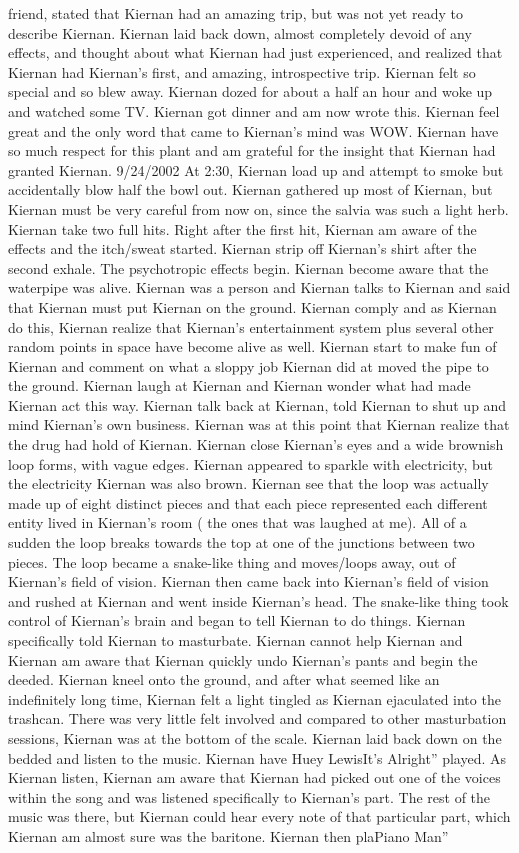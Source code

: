 \documentclass[12pt]{book}
\begin{document}
friend, stated that Kiernan had an amazing trip, but was not yet ready to describe Kiernan. Kiernan laid back down, almost completely devoid of any effects, and thought about what Kiernan had just experienced, and realized that Kiernan had Kiernan's first, and amazing, introspective trip. Kiernan felt so special and so blew away. Kiernan dozed for about a half an hour and woke up and watched some TV. Kiernan got dinner and am now wrote this. Kiernan feel great and the only word that came to Kiernan's mind was WOW. Kiernan have so much respect for this plant and am grateful for the insight that Kiernan had granted Kiernan. 9/24/2002 At 2:30, Kiernan load up and attempt to smoke but accidentally blow half the bowl out. Kiernan gathered up most of Kiernan, but Kiernan must be very careful from now on, since the salvia was such a light herb. Kiernan take two full hits. Right after the first hit, Kiernan am aware of the effects and the itch/sweat started. Kiernan strip off Kiernan's shirt after the second exhale. The psychotropic effects begin. Kiernan become aware that the waterpipe was alive. Kiernan was a person and Kiernan talks to Kiernan and said that Kiernan must put Kiernan on the ground. Kiernan comply and as Kiernan do this, Kiernan realize that Kiernan's entertainment system plus several other random points in space have become alive as well. Kiernan start to make fun of Kiernan and comment on what a sloppy job Kiernan did at moved the pipe to the ground. Kiernan laugh at Kiernan and Kiernan wonder what had made Kiernan act this way. Kiernan talk back at Kiernan, told Kiernan to shut up and mind Kiernan's own business. Kiernan was at this point that Kiernan realize that the drug had hold of Kiernan. Kiernan close Kiernan's eyes and a wide brownish loop forms, with vague edges. Kiernan appeared to sparkle with electricity, but the electricity Kiernan was also brown. Kiernan see that the loop was actually made up of eight distinct pieces and that each piece represented each different entity lived in Kiernan's room ( the ones that was laughed at me). All of a sudden the loop breaks towards the top at one of the junctions between two pieces. The loop became a snake-like thing and moves/loops away, out of Kiernan's field of vision. Kiernan then came back into Kiernan's field of vision and rushed at Kiernan and went inside Kiernan's head. The snake-like thing took control of Kiernan's brain and began to tell Kiernan to do things. Kiernan specifically told Kiernan to masturbate. Kiernan cannot help Kiernan and Kiernan am aware that Kiernan quickly undo Kiernan's pants and begin the deeded. Kiernan kneel onto the ground, and after what seemed like an indefinitely long time, Kiernan felt a light tingled as Kiernan ejaculated into the trashcan. There was very little felt involved and compared to other masturbation sessions, Kiernan was at the bottom of the scale. Kiernan laid back down on the bedded and listen to the music. Kiernan have Huey LewisIt's Alright'' played. As Kiernan listen, Kiernan am aware that Kiernan had picked out one of the voices within the song and was listened specifically to Kiernan's part. The rest of the music was there, but Kiernan could hear every note of that particular part, which Kiernan am almost sure was the baritone. Kiernan then plaPiano Man'' 
\end{document}

